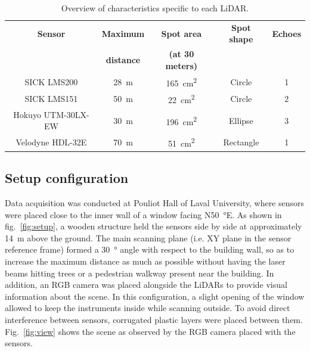 \begin{table}[htbp]
    \centering
    \begin{tabular}{|c|c|c|c|c|}
        \hline
        \textbf{Sensor}     & \textbf{Maximum}           & \textbf{Spot area}             & \textbf{Spot shape} & \textbf{Echoes} \\
                            & \textbf{distance}          & \textbf{(at 30 meters)}        &                     &                 \\\hline
        SICK LMS200         & \SI{28}{\meter}            & \SI{165}{\centi\meter\squared} & Circle              & 1               \\\hline
        SICK LMS151         & \SI{50}{\meter}            & \SI{22}{\centi\meter\squared}  & Circle              & 2               \\\hline
        Hokuyo UTM-30LX-EW  & \SI{30}{\meter}            & \SI{196}{\centi\meter\squared} & Ellipse             & 3               \\\hline
        Velodyne HDL-32E    & \SI{70}{\meter}            & \SI{51}{\centi\meter\squared}  & Rectangle           & 1               \\\hline
    \end{tabular}
    \caption{Overview of characteristics specific to each LiDAR.}
    \label{tab:lidars}
\end{table}

\subsection{Setup configuration}

Data acquisition was conducted at Pouliot Hall of Laval University, where sensors were placed close to the inner wall of a window facing N\SI{50}{\degree}E. As shown in fig.~\ref{fig:setup}, a wooden structure held the sensors side by side at approximately \SI{14}{\meter} above the ground. The main scanning plane (i.e. XY plane in the sensor reference frame) formed a \SI{30}{\degree} angle with respect to the building wall, so as to increase the maximum distance as much as possible without having the laser beams hitting  trees or a pedestrian walkway present near the building. In addition, an RGB camera was placed alongside the LiDARs to provide visual information about the scene. In this configuration, a slight opening of the window allowed to keep the instruments inside while scanning outside. To avoid direct interference between sensors, corrugated plastic layers were placed between them. Fig.~\ref{fig:view} shows the scene as observed by the RGB camera placed with the sensors.

